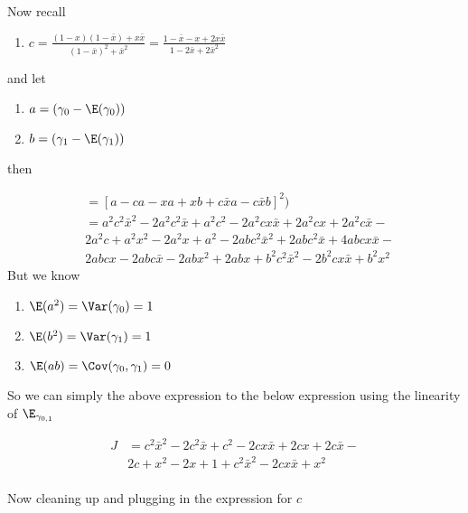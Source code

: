Now recall

\begin{enumerate}
	\item $c = \frac{(1-x)(1-\bar{x}) + x\bar{x}}{(1-\bar{x})^2 + \bar{x}^2} = \frac{1-\bar{x} -x  + 2x\bar{x}}{1-2 \bar{x} + 2\bar{x}^2} $
\end{enumerate}

and let 

\begin{enumerate}
	\item $a = (\gamma_0 - \E(\gamma_0))$
	\item $b = (\gamma_1 - \E(\gamma_1))$
\end{enumerate}

then

\begin{align*}
	  &= [ a - ca -xa + xb  +c \bar{x}a - c \bar{x}b]^2) \\
	  &=a^2c^2\bar{x}^2-2a^2c^2\bar{x}+a^2c^2-2a^2cx\bar{x}+2a^2cx+2a^2c\bar{x}-\\
	  &2a^2c+a^2x^2-2a^2x+a^2-2abc^2\bar{x}^2+2abc^2\bar{x}+4abcx\bar{x}-\\
	  &2abcx-2abc\bar{x}-2abx^2+2abx+b^2c^2\bar{x}^2-2b^2cx\bar{x}+b^2x^2
\end{align*} 
But we know


\begin{enumerate}
	\item $\E(a^2) = \Var(\gamma_0) = 1$
	\item $\E(b^2) = \Var(\gamma_1) = 1$
	\item $\E(ab) = \Cov(\gamma_0,\gamma_1) = 0$
\end{enumerate} 

So we can simply the above expression to the below expression using the linearity of $\E_{\gamma_{0,1}}$


\begin{align*}
	  J&=c^2\bar{x}^2-2c^2\bar{x}+c^2-2cx\bar{x}+2cx+2c\bar{x}-\\
	  &2c+x^2-2x+1 +c^2\bar{x}^2-2cx\bar{x}+x^2 \\
  \end{align*} 

  Now cleaning up and plugging in the expression for $c$

